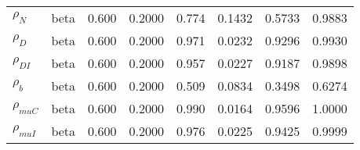 \begin{center}
\begin{longtable}{llcccccc}
${\rho_N}$ & beta &   0.600 & 0.2000 &   0.774& 0.1432 &  0.5733 &  0.9883 \\ 
${\rho_D}$ & beta &   0.600 & 0.2000 &   0.971& 0.0232 &  0.9296 &  0.9930 \\ 
${\rho_{DI}}$ & beta &   0.600 & 0.2000 &   0.957& 0.0227 &  0.9187 &  0.9898 \\ 
${\rho_b}$ & beta &   0.600 & 0.2000 &   0.509& 0.0834 &  0.3498 &  0.6274 \\ 
${\rho_{muC}}$ & beta &   0.600 & 0.2000 &   0.990& 0.0164 &  0.9596 &  1.0000 \\ 
${\rho_{muI}}$ & beta &   0.600 & 0.2000 &   0.976& 0.0225 &  0.9425 &  0.9999 \\ 
\end{longtable}
 \end{center}
